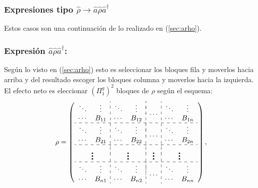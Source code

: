 \subsubsection{Expresiones tipo $\hat{\rho}\rightarrow \hat{a}\hat{\rho}\hat{a}^{\dag}$}\label{sec:expre_modales_orden2}
\quad Estos casos son una continuaci\'on de lo realizado en (\ref{sec:arho}).
\subsubsection*{Expresi\'on $\hat{a}\hat{\rho}\hat{a}^{\dag}$: } \quad Seg\'un lo visto en (\ref{sec:arho}) esto es seleccionar los bloques fila y moverlos hacia arriba y del resultado escoger los bloques columna y moverlos hacia la izquierda. El efecto neto es eleccionar $(\Pi_1^g)^2$ bloques de $\rho$ seg\'un el esquema:\\\begin{equation}\rho=\left(
 \begin{array}{cc:cc:cc:cc}
\ddots&\vdots& \ddots&\vdots& \multicolumn{2}{:c:}{\multirow{2}{*}{$\mathbf{\cdots}$} } &\ddots &\vdots \\
\cdots&B_{11}& \cdots & B_{12}& & &\cdots& B_{1n}\\\hdashline

\ddots&\vdots& \ddots&\vdots& \multicolumn{2}{:c:}{\multirow{2}{*}{$\mathbf{\cdots}$} } & \ddots&\vdots \\
\cdots&B_{21}& \cdots & B_{22}& & &\cdots& B_{2n}\\\hdashline
\multicolumn{2}{c:}{\multirow{2}{*}{\Huge$\vdots$} } & \multicolumn{2}{:c:}{\multirow{2}{*}{\Huge$\vdots$} } & \multicolumn{2}{:c:}{\multirow{2}{*}{\Huge$\vdots$} }&\multicolumn{2}{:c}{\multirow{2}{*}{\Huge$\vdots$} }\\
&&&&&&& \\\hdashline
\ddots&\vdots& \ddots&\vdots& \multicolumn{2}{:c:}{\multirow{2}{*}{$\mathbf{\cdots}$} } & \ddots&\vdots \\
\cdots&B_{n1}& \cdots & B_{n2}& & &\cdots& B_{nn}
\end{array}\right),
\end{equation}
